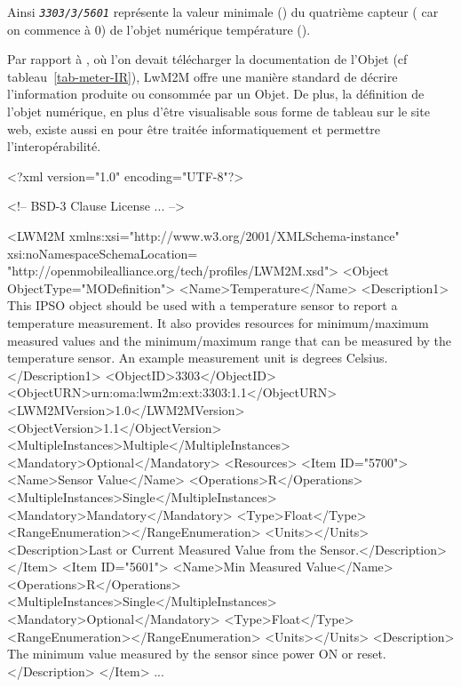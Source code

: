         \vspace{1em}
         
Ainsi \textit{\texttt{3303/3/5601}} représente la valeur minimale (\textit{}) du quatrième capteur (\textit{} car on commence à 0) de l'objet numérique température (\textit{}).

Par rapport à , où l'on devait télécharger la documentation de l'Objet (cf tableau~\vref{tab-meter-IR}), LwM2M offre une manière standard de décrire l'information produite ou consommée par un Objet. De plus, la définition de l'objet numérique, en plus d'être visualisable sous forme de tableau sur le site web, existe aussi en  pour être traitée informatiquement et permettre l'interopérabilité.

\begin{termc}[backgroundcolor=\color{blue!10}, basicstyle=\ttfamily\tiny, escapechar=@, language=xml] %
<?xml version="1.0" encoding="UTF-8"?>

<!-- BSD-3 Clause License ... -->

<LWM2M  xmlns:xsi="http://www.w3.org/2001/XMLSchema-instance" xsi:noNamespaceSchemaLocation=
"http://openmobilealliance.org/tech/profiles/LWM2M.xsd">
	<Object ObjectType="MODefinition">
		<Name>Temperature</Name>
		<Description1>
		    This IPSO object should be used with a temperature sensor to report a temperature
		    measurement.  It also provides resources for minimum/maximum measured values and the
		    minimum/maximum range that can be measured 
		    by the temperature sensor. An example measurement unit is degrees Celsius.
		</Description1>
		<ObjectID>3303</ObjectID>
		<ObjectURN>urn:oma:lwm2m:ext:3303:1.1</ObjectURN>
		<LWM2MVersion>1.0</LWM2MVersion>
		<ObjectVersion>1.1</ObjectVersion>
		<MultipleInstances>Multiple</MultipleInstances>
		<Mandatory>Optional</Mandatory>
		<Resources>
			<Item ID="5700">
				<Name>Sensor Value</Name>
				<Operations>R</Operations>
				<MultipleInstances>Single</MultipleInstances>
				<Mandatory>Mandatory</Mandatory>
				<Type>Float</Type>
				<RangeEnumeration></RangeEnumeration>
				<Units></Units>
				<Description>Last or Current Measured Value from the Sensor.</Description>
			</Item>
			<Item ID="5601">
				<Name>Min Measured Value</Name>
				<Operations>R</Operations>
				<MultipleInstances>Single</MultipleInstances>
				<Mandatory>Optional</Mandatory>
				<Type>Float</Type>
				<RangeEnumeration></RangeEnumeration>
				<Units></Units>
				<Description>
				  The minimum value measured by the sensor since power ON or reset.
				  </Description>
			</Item>
			...
\end{termc}

